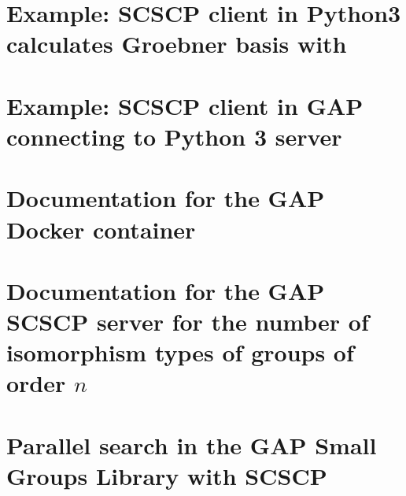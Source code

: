 \documentclass{deliverablereport}
\begin{document}
\section{Example: SCSCP client in Python3 calculates Groebner basis with \Singular}\label{Python3sympy-to-GAP-Singular}



\section{Example: SCSCP client in GAP connecting to Python 3 server}\label{GAP-to-Python3numpy}


\section{Documentation for the GAP Docker container}\label{SCSCP-with-GAP-docker}


\section{Documentation for the GAP SCSCP server for the number of isomorphism types of groups of order $n$}\label{Gnu-SCSCP-server}


\section{Parallel search in the GAP Small Groups Library with SCSCP}
\label{Parallel-GAP-SCSCP}

\end{document}

